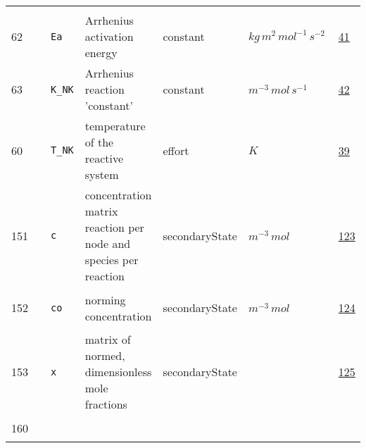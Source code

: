 \begin{longtable}{|p{1cm}|p{2.5cm}|p{4.5cm}|p{8cm}|p{3.0cm}|p{3cm}|p{1cm}|}
             & \\
        62
             & \hypertarget{"v:62"}{ $ {} $}
             & \verb|Ea|
             & Arrhenius activation energy
             & \begin{lay}constant \end{lay}
             & $ kg \,m^{2} \,mol^{-1} \,s^{-2} \, $
             &                 \hyperlink{"e:41"}{ 41 }
                 \\
        63
             & \hypertarget{"v:63"}{ $ {} $}
             & \verb|K_NK|
             & Arrhenius reaction 'constant'
             & \begin{lay}constant \end{lay}
             & $ m^{-3} \,mol \,s^{-1} \, $
             &                 \hyperlink{"e:42"}{ 42 }
                 \\
        60
             & \hypertarget{"v:60"}{ $ {} $}
             & \verb|T_NK|
             & temperature of the reactive system
             & \begin{lay}effort \end{lay}
             & $ K \, $
             &                 \hyperlink{"e:39"}{ 39 }
                 \\
        151
             & \hypertarget{"v:151"}{ $ {} $}
             & \verb|c|
             & concentration matrix reaction per node and species per reaction
             & \begin{lay}secondaryState \end{lay}
             & $ m^{-3} \,mol \, $
             &                 \hyperlink{"e:123"}{ 123 }
                 \\
        152
             & \hypertarget{"v:152"}{ $ {} $}
             & \verb|co|
             & norming concentration
             & \begin{lay}secondaryState \end{lay}
             & $ m^{-3} \,mol \, $
             &                 \hyperlink{"e:124"}{ 124 }
                 \\
        153
             & \hypertarget{"v:153"}{ $ {} $}
             & \verb|x|
             & matrix of normed, dimensionless mole fractions 
             & \begin{lay}secondaryState \end{lay}
             & $  $
             &                 \hyperlink{"e:125"}{ 125 }
                 \\
        160
             & \hypertarget{"v:160"}{ $ {} $}

\end{longtable}
